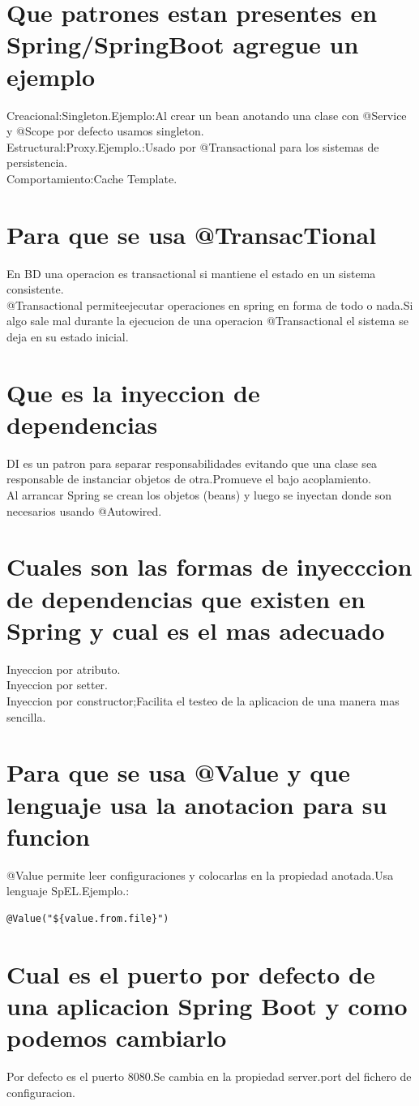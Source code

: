 \section{Que patrones estan presentes en Spring/SpringBoot agregue un ejemplo}
Creacional:Singleton.Ejemplo:Al crear un bean anotando una clase con @Service y @Scope por defecto usamos singleton.\\
Estructural:Proxy.Ejemplo.:Usado por @Transactional para los sistemas de persistencia.\\
Comportamiento:Cache Template. 
\section{Para que se usa @TransacTional}
En BD una operacion es transactional si mantiene el estado en un sistema consistente.\\
@Transactional permiteejecutar operaciones en spring en forma de todo o nada.Si algo sale mal durante la ejecucion de una operacion @Transactional el sistema se deja en su estado inicial.
\section{Que es la inyeccion de dependencias}
DI es un patron para separar responsabilidades evitando que una clase sea responsable de instanciar objetos de otra.Promueve el bajo acoplamiento.\\
Al arrancar Spring se crean los objetos (beans) y luego se inyectan donde son necesarios usando @Autowired.
\section{Cuales son las formas de inyecccion de dependencias que existen en Spring y cual es el mas adecuado}
Inyeccion por atributo.\\
Inyeccion por setter.\\
Inyeccion por constructor;Facilita el testeo de la aplicacion de una manera mas sencilla.
\section{Para que se usa @Value y que lenguaje usa la anotacion para su funcion}
@Value permite leer configuraciones y colocarlas en la propiedad anotada.Usa lenguaje SpEL.Ejemplo.:
\begin{lstlisting}
@Value("${value.from.file}")
\end{lstlisting}
\section{Cual es el puerto por defecto de una aplicacion Spring Boot y como podemos cambiarlo}
Por defecto es el puerto 8080.Se cambia en la propiedad server.port del fichero de configuracion.

